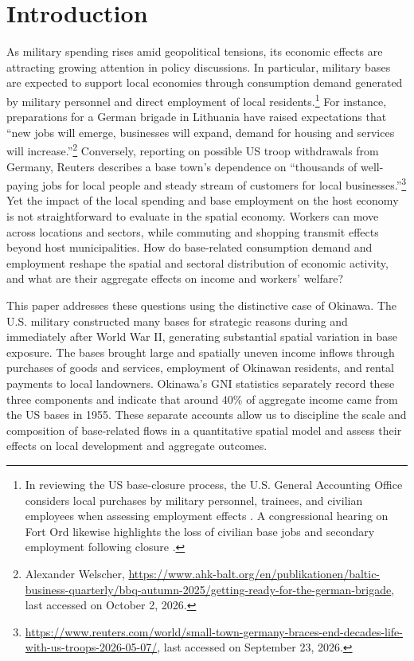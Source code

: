 \documentclass[12pt, unicode, a4paper]{article}
\newcommand{\1}{\mbox{1}\hspace{-0.25em}\mbox{l}} %
\begin{document}
\section{Introduction}
As military spending rises amid geopolitical tensions, its economic effects are attracting growing attention in policy discussions. In particular, military bases are expected to support local economies through consumption demand generated by military personnel and direct employment of local residents.\footnote{
In reviewing the US base-closure process, the U.S. General Accounting Office considers local purchases by military personnel, trainees, and civilian employees when assessing employment effects \citep{USGAO1995}. A congressional hearing on Fort Ord likewise highlights the loss of civilian base jobs and secondary employment following closure \citep{USHouse2002FortOrd}.}
For instance, preparations for a German brigade in Lithuania have raised expectations that ``new jobs will emerge, businesses will expand, demand for housing and services will increase.''\footnote{Alexander Welscher, \url{https://www.ahk-balt.org/en/publikationen/baltic-business-quarterly/bbq-autumn-2025/getting-ready-for-the-german-brigade}, last accessed on October 2, 2026.} Conversely, reporting on possible US troop withdrawals from Germany, Reuters describes a base town's dependence on ``thousands of well-paying jobs for local people and steady stream of customers for local businesses.''\footnote{\url{https://www.reuters.com/world/small-town-germany-braces-end-decades-life-with-us-troops-2026-05-07/}, last accessed on September 23, 2026.}
Yet the impact of the local spending and base employment on the host economy is not straightforward to evaluate in the spatial economy. Workers can move across locations and sectors, while commuting and shopping transmit effects beyond host municipalities. How do base-related consumption demand and employment reshape the spatial and sectoral distribution of economic activity, and what are their aggregate effects on income and workers' welfare?


This paper addresses these questions using the distinctive case of Okinawa. The U.S. military constructed many bases for strategic reasons during and immediately after World War II, generating substantial spatial variation in base exposure. The bases brought large and spatially uneven income inflows through purchases of goods and services, employment of Okinawan residents, and rental payments to local landowners. Okinawa's GNI statistics separately record these three components and indicate that around 40\% of aggregate income came from the US bases in 1955. These separate accounts allow us to discipline the scale and composition of base-related flows in a quantitative spatial model and assess their effects on local development and aggregate outcomes.
\end{document}
